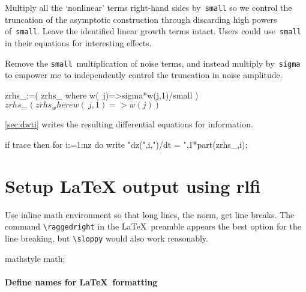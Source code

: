 \documentclass[11pt,a5paper]{article}
\begin{document}
Multiply all the `nonlinear' terms right-hand sides by~\verb|small| so we control the truncation of the asymptotic construction through discarding high powers of~\verb|small|.
Leave the identified linear growth terms intact.
Users could use~\verb|small| in their equations for interesting effects. 

Remove the \verb|small|~multiplication of noise terms, and instead multiply by~\verb|sigma| to empower me to independently control the truncation in noise amplitude.
\begin{reduce} 
zrhs_:=( zrhs_ where w(~j)=>sigma*w(j,1)/small )$
zrhs_:=( zrhs_ where w(~j,1)=>w(j) )$
\end{reduce}

\cref{sec:dwti} writes the resulting differential equations for information.
\begin{reduce}
if trace then for i:=1:nz do 
    write "dz(",i,")/dt = ",1*part(zrhs_,i);
\end{reduce}








\section{Setup LaTeX output using rlfi}

Use inline math environment so that long lines, the norm, get line breaks.
The command \verb|\raggedright| in the \LaTeX\ preamble appears the best option for the line breaking, but \verb|\sloppy| would also work reasonably.
\begin{reduce}
mathstyle math;
\end{reduce}

\paragraph{Define names for \LaTeX\ formatting}
\end{document}
